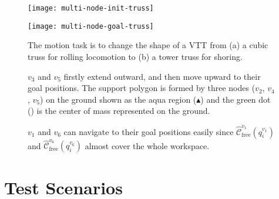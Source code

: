 \documentclass[journal]{IEEEtran}
\begin{document}
\begin{figure}[b]
  \centering
  \begin{subfloat}[]{\texttt{[image: multi-node-init-truss]}\label{fig:multi-node-init-truss}}
  \end{subfloat}
  \hfil
  \begin{subfloat}[]{\texttt{[image: multi-node-goal-truss]}\label{fig:multi-node-goal-truss}}
  \end{subfloat}
  \caption{The motion task is to change the shape of a VTT from (a) a
    cubic truss for rolling locomotion to (b) a tower truss for
    shoring.}
  \label{fig:geometry-reconfig-test}
\end{figure}

\begin{figure*}[t]
  \centering
  \hfil
  \hfil
  \hfil
  \hfil
  \caption{$v_3$ and $v_5$ firstly extend outward, and then move
    upward to their goal positions. The support polygon is formed by
    three nodes ($v_2$, $v_4$, $v_5$) on the ground shown as the aqua
    region ({\color[rgb]{0,1,1}$\blacktriangle$}) and the green dot
    ({\color{green}{$\bullet$}}) is the center of mass represented on
    the ground.}
  \label{fig:geometry-reconfig-node-3-5}

  \centering
  \hfil
  \hfil
  \caption{$v_1$ and $v_6$ can navigate to their goal positions easily
    since $\widehat{\mathcal{C}}_{\mathrm{free}}^{v_1}(q_i^{v_1})$ and
    $\widehat{\mathcal{C}}_{\mathrm{free}}^{v_6}(q_i^{v_6})$ almost cover the
    whole workspace.}
  \label{fig:geometry-reconfig-node-1-6}
\end{figure*}

\section{Test Scenarios}
\label{sec:experiment}
\end{document}
